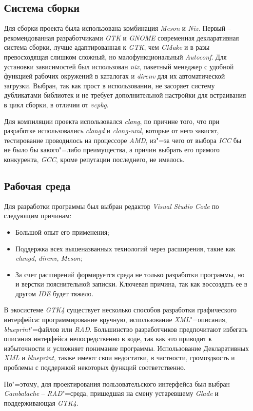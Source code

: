 \subsection{Система сборки}
Для сборки проекта была использована комбинация \textit{Meson} и \textit{Nix}.
Первый -- рекомендованная разработчиками \textit{GTK} и \textit{GNOME}
современная декларативная система сборки, лучше адаптированная к \textit{GTK},
чем \textit{CMake} и в разы превосходящая слишком сложный, но малофункциональный
\textit{Autoconf}. Для установки зависимостей был использован \textit{nix},
пакетный менеджер с удобной функцией рабочих окружений в каталогах и
\textit{direnv} для их автоматической загрузки. Выбран, так как прост в
использовании, не засоряет систему дубликатами библиотек и не требует
дополнительной настройки для встраивания в цикл сборки, в отличии от
\textit{vcpkg}.

Для компиляции проекта использовался \textit{clang}, по причине того, что при
разработке использовались \textit{clangd} и \textit{clang-uml}, которые от него
зависят, тестирование проводилось на процессоре \textit{AMD}, из"=за чего от
выбора \textit{ICC} бы не было бы какого"=либо преимущества, а причин выбрать
его прямого конкурента, \textit{GCC}, кроме репутации последнего, не имелось.

\subsection{Рабочая среда}
Для разработки программы был выбран редактор \textit{Visual Studio Code} по
следующим причинам:

\begin{itemize}
      \item Большой опыт его применения;
      \item Поддержка всех вышеназванных технологий через расширения, такие как
            \textit{clangd}, \textit{direnv}, \textit{Meson};
      \item За счет расширений формируется среда не только разработки программы,
            но и верстки пояснительной записки. Ключевая причина, так как
            воссоздать ее в другом \textit{IDE} будет тяжело.
\end{itemize}

В экосистеме \textit{GTK4} существует несколько способов разработки графического
интерфейса: программирование вручную, использование \textit{XML}"=описания,
\textit{blueprint}"=файлов или \textit{RAD}. Большинство разработчиков
предпочитают избегать описания интерфейса непосредственно в коде, так как это
приводит к избыточности и усложняет понимание программы. Использование
Декларативных \textit{XML} и \textit{blueprint}, также имеют свои недостатки, в
частности, громоздкость и проблемы с поддержкой некоторых функций
соответственно.

По"=этому, для проектирования пользовательского интерфейса был выбран
\textit{Cambalache} -- \textit{RAD}"=среда, пришедшая на смену устаревшему
\textit{Glade} и поддерживающая \textit{GTK4}.
